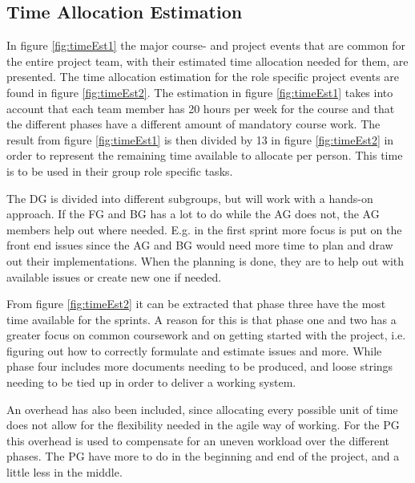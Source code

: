 \documentclass{article}
\begin{document}
\subsection{Time Allocation Estimation}
In figure \ref{fig:timeEst1} the major course- and project events that are common for the entire project team, with their estimated time allocation needed for them, are presented. The time allocation estimation for the role specific project events are found in figure \ref{fig:timeEst2}. The estimation in figure \ref{fig:timeEst1} takes into account that each team  member has 20 hours per week for the course and that the different phases have a different amount of mandatory course work. The result from figure \ref{fig:timeEst1} is then divided by 13 in figure \ref{fig:timeEst2} in order to represent the remaining time available to allocate per person. This time is to be used in their group role specific tasks. 

The DG is divided into different subgroups, but will work with a hands-on approach. If the FG and BG has a lot to do while the AG does not, the AG members help out where needed. E.g. in the first sprint more focus is put on the front end issues since the AG and BG would need more time to plan and draw out their implementations. When the planning is done, they are to help out with available issues or create new one if needed. 

From figure \ref{fig:timeEst2} it can be extracted that phase three have the most time available for the sprints. A reason for this is that phase one and two has a greater focus on common coursework and on getting started with the project, i.e. figuring out how to correctly formulate and estimate issues and more. While phase four includes more documents needing to be produced, and loose strings needing to be tied up in order to deliver a working system. 

An overhead has also been included, since allocating every possible unit of time does not allow for the flexibility needed in the agile way of working. For the PG this overhead is used to compensate for an uneven workload over the different phases. The PG have more to do in the beginning and end of the project, and a little less in the middle. 
\end{document}
